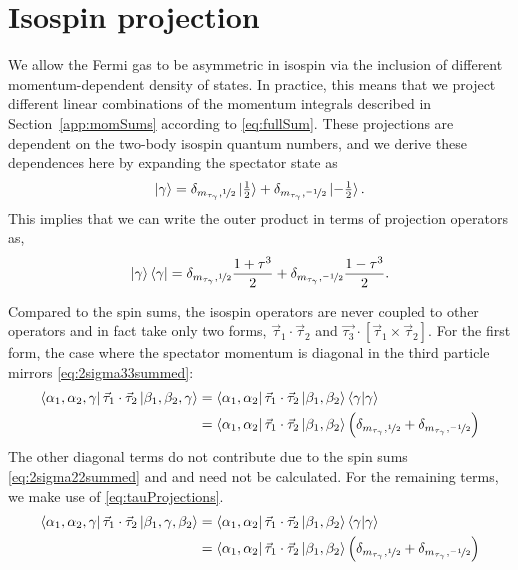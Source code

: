 \section{Isospin projection}
We allow the Fermi gas to be asymmetric in isospin via the inclusion of different momentum-dependent density of states. In practice, this means that we project different linear combinations of the momentum integrals described in Section~\ref{app:momSums} according to \eqref{eq:fullSum}. These projections are dependent on the two-body isospin quantum numbers, and we derive these dependences here by expanding the spectator state as 
\begin{equation}
\ket{\gamma}=\delta_{m_{\tau_\gamma},\nicefrac{1}{2}}\ket{\tfrac{1}{2}}+\delta_{m_{\tau_\gamma},\nicefrac{-1}{2}}\ket{-\tfrac{1}{2}}.
\end{equation}
This implies that we can write the outer product in terms of projection operators as,
\begin{equation}\label{eq:tauProjections}
\ket{\gamma}\bra{\gamma} = \delta_{m_{\tau_\gamma},\nicefrac{1}{2}}\dfrac{1+\tau^3}{2}+\delta_{m_{\tau_\gamma},\nicefrac{-1}{2}}\frac{1-\tau^3}{2}.
\end{equation}

Compared to the spin sums, the isospin operators are never coupled to other operators and in fact take only two forms, $\vec{\tau}_1\cdot\vec{\tau}_2$ and $\vec{\tau_3}\cdot[\vec{\tau}_1\times\vec{\tau}_2]$. For the first form, the case where the spectator momentum is diagonal in the third particle mirrors \eqref{eq:2sigma33summed}:
\begin{equation}\begin{split}
\bra{\alpha_1,\alpha_2, \gamma } \vec{\tau}_1\cdot \vec{\tau}_2 \ket{\beta_1, \beta_2, \gamma} 
&= \bra{\alpha_1,\alpha_2 } \vec{\tau}_1\cdot \vec{\tau}_2 \ket{\beta_1, \beta_2} \braket{\gamma|\gamma} \\
&= \bra{\alpha_1,\alpha_2 } \vec{\tau}_1\cdot \vec{\tau}_2 \ket{\beta_1, \beta_2} \left(\delta_{m_{\tau_\gamma},\nicefrac{1}{2}}+\delta_{m_{\tau_\gamma},\nicefrac{-1}{2}} \right) 
\end{split}
\end{equation}
The other diagonal terms do not contribute due to the spin sums \eqref{eq:2sigma22summed} and \label{eq:3sigma32summed} and need not be calculated. For the remaining terms, we make use of \eqref{eq:tauProjections}. 
\begin{equation}\begin{split}
\bra{\alpha_1, \alpha_2, \gamma } \vec{\tau}_1\cdot \vec{\tau}_2 \ket{\beta_1,\gamma,  \beta_2} 
&= \bra{\alpha_1,\alpha_2 } \vec{\tau}_1\cdot \vec{\tau}_2 \ket{\beta_1, \beta_2} \braket{\gamma|\gamma} \\
&= \bra{\alpha_1,\alpha_2 } \vec{\tau}_1\cdot \vec{\tau}_2 \ket{\beta_1, \beta_2} \left(\delta_{m_{\tau_\gamma},\nicefrac{1}{2}}+\delta_{m_{\tau_\gamma},\nicefrac{-1}{2}} \right) 
\end{split}
\end{equation}

